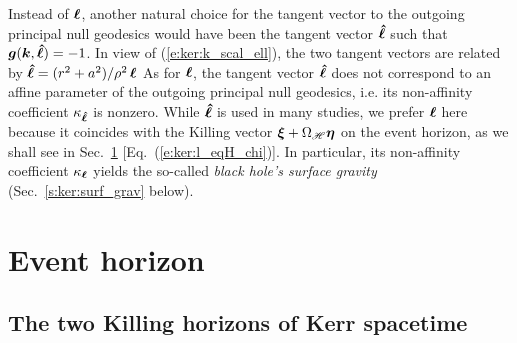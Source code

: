 \begin{remark}
Instead of $\bm{\ell}$, another natural choice for the tangent vector to the outgoing
principal null geodesics
would have been the tangent vector $\bm{\hat{\ell}}$
such that $\bm{g}(\bm{k}, \bm{\hat{\ell}}) = - 1$.
In view of (\ref{e:ker:k_scal_ell}), the two tangent vectors are related by
$\bm{\hat{\ell}} = (r^2 + a^2)/\rho^2\,  \bm{\ell}$
As for $\bm{\ell}$, the tangent vector $\bm{\hat{\ell}}$ does not correspond to
an affine parameter of the outgoing
principal null geodesics, i.e. its
non-affinity coefficient $\kappa_{\bm{\hat{\ell}}}$ is nonzero. While
$\bm{\hat{\ell}}$ is used in many studies, we prefer $\bm{\ell}$ here because it
coincides with the Killing vector $\bm{\xi} + \Omega_{\mathscr{H}} \bm{\eta}$
on the event horizon, as we shall see in Sec.~\ref{s:ker:event_hor_gen}
[Eq.~(\ref{e:ker:l_eqH_chi})]. In particular, its
non-affinity coefficient $\kappa_{\bm{\ell}}$ yields the so-called
\emph{black hole's surface gravity} (Sec.~\ref{s:ker:surf_grav} below).
\end{remark}





\section{Event horizon} \label{s:ker:event_hor_gen}

\subsection{The two Killing horizons of Kerr spacetime} \label{s:ker:Killing_hor}

